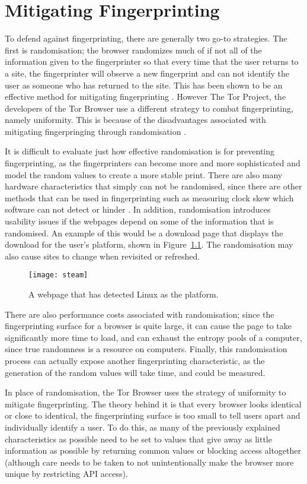\chapter{Mitigating Fingerprinting}

To defend against fingerprinting, there are generally two go-to strategies.
The first is randomisation; the browser randomizes much of if not all of the information given to the fingerprinter so that every time that the user returns to a site, the fingerprinter will observe a new fingerprint and can not identify the user as someone who has returned to the site.
This has been shown to be an effective method for mitigating fingerprinting \citep{privaricator}.
However The Tor Project, the developers of the Tor Browser use a different strategy to combat fingerprinting, namely uniformity.
This is because of the disadvantages associated with mitigating fingerpringing through randomisation \citep{tor-project}.

It is difficult to evaluate just how effective randomisation is for preventing fingerprinting, as the fingerprinters can become more and more sophisticated and model the random values to create a more stable print.
There are also many hardware characteristics that simply can not be randomised, since there are other methods that can be used in fingerprinting such as measuring clock skew which software can not detect or hinder \citep{skew}.
In addition, randomisation introduces usability issues if the webpages depend on some of the information that is randomised.
An example of this would be a download page that displays the download for the user's platform, shown in Figure~\ref{fig:steam}.
The randomisation may also cause sites to change when revisited or refreshed.

\begin{figure}[h]
\texttt{[image: steam]}
\centering
\label{fig:steam}
\caption{A webpage that has detected Linux as the platform.}
\end{figure}

There are also performance costs associated with randomisation; since the fingerprinting surface for a browser is quite large, it can cause the page to take significantly more time to load, and can exhaust the entropy pools of a computer, since true randomness is a resource on computers.
Finally, this randomisation process can actually expose another fingerprinting characteristic, as the generation of the random values will take time, and could be measured.

In place of randomisation, the Tor Browser uses the strategy of uniformity to mitigate fingerprinting.
The theory behind it is that every browser looks identical or close to identical, the fingerprinting surface is too small to tell users apart and individually identify a user.
To do this, as many of the previously explained characteristics as possible need to be set to values that give away as little information as possible by returning common values or blocking access altogether (although care needs to be taken to not unintentionally make the browser more unique by restricting API access).

